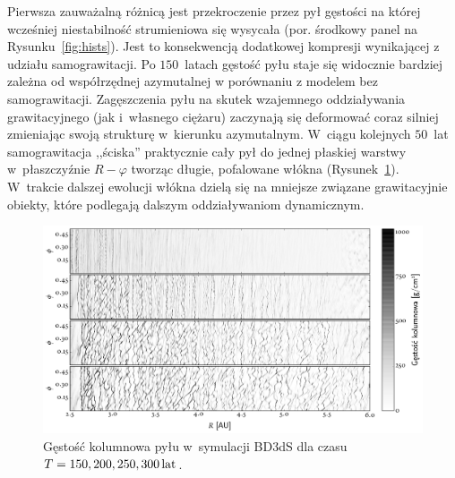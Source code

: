 %
\par Pierwsza zauważalną różnicą jest przekroczenie przez pył gęstości na której
wcześniej niestabilność strumieniowa się wysycała (por. środkowy panel na
Rysunku~\ref{fig:hists}). Jest to konsekwencją dodatkowej kompresji wynikającej
z udziału samograwitacji.
Po $150$~latach gęstość pyłu staje się widocznie bardziej
zależna od współrzędnej azymutalnej w porównaniu z modelem bez samograwitacji.
Zagęszczenia pyłu na skutek wzajemnego oddziaływania grawitacyjnego (jak
i~własnego ciężaru) zaczynają się deformować coraz silniej zmieniając swoją
strukturę w~kierunku azymutalnym. W~ciągu kolejnych $50$~lat samograwitacja
,,ściska'' praktycznie cały pył do jednej płaskiej warstwy w~płaszczyźnie $R -
\varphi$ tworząc długie, pofalowane włókna (Rysunek~\ref{fig:projs}). W~trakcie
dalszej ewolucji włókna dzielą się na mniejsze związane grawitacyjnie obiekty,
które podlegają dalszym oddziaływaniom dynamicznym. 
%
\begin{figure}
   \centering
   \includegraphics[width=0.95\linewidth]{figures/proj_sg}
   \caption[Gęstość kolumnowa pyłu w~symulacji BD3dS.]
      {Gęstość kolumnowa pyłu w~symulacji BD3dS dla czasu $T=150, 200, 250, 300\hbox{$\thinspace\textrm{lat}$}$.}
   \label{fig:projs}
\end{figure}
%
